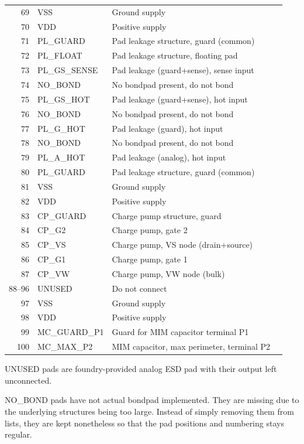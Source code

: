 \documentclass{cernatsnote}
\begin{document}
\begin{longtable}{r l l l}
69 & VSS             & Ground supply\\
70 & VDD             & Positive supply\\
71 & PL\_GUARD       & Pad leakage structure, guard (common)\\
72 & PL\_FLOAT       & Pad leakage structure, floating pad\\
73 & PL\_GS\_SENSE   & Pad leakage (guard+sense), sense input\\
74 & NO\_BOND        & No bondpad present, do not bond\\
75 & PL\_GS\_HOT     & Pad leakage (guard+sense), hot input\\
76 & NO\_BOND        & No bondpad present, do not bond\\
77 & PL\_G\_HOT      & Pad leakage (guard), hot input\\
78 & NO\_BOND        & No bondpad present, do not bond\\
79 & PL\_A\_HOT      & Pad leakage (analog), hot input\\
80 & PL\_GUARD       & Pad leakage structure, guard (common)\\
81 & VSS             & Ground supply\\
82 & VDD             & Positive supply\\
83 & CP\_GUARD       & Charge pump structure, guard\\
84 & CP\_G2          & Charge pump, gate 2\\
85 & CP\_VS          & Charge pump, VS node (drain+source)\\
86 & CP\_G1          & Charge pump, gate 1\\
87 & CP\_VW          & Charge pump, VW node (bulk)\\
88--96 & UNUSED       & Do not connect\\
97 & VSS             & Ground supply\\
98 & VDD             & Positive supply\\
99 & MC\_GUARD\_P1   & Guard for MIM capacitor terminal P1\\
100& MC\_MAX\_P2     & MIM capacitor, max perimeter, terminal P2\\
\bottomrule
\end{longtable}UNUSED pads are foundry-provided analog ESD pad with their output left unconnected.

NO\_BOND pads have not actual bondpad implemented. They are missing due to the underlying structures being too large.
Instead of simply removing them from lists, they are kept nonetheless  so that the pad positions and numbering stays regular.
\end{document}
